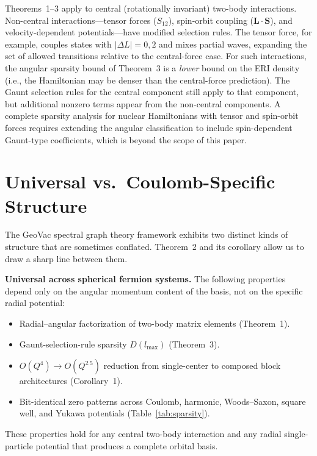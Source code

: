 \documentclass[twocolumn,pra,amsmath,amssymb,superscriptaddress]{revtex4-2}
\begin{document}
Theorems~1--3 apply to central (rotationally invariant) two-body
interactions.  Non-central interactions---tensor forces
($S_{12}$), spin-orbit coupling ($\mathbf{L} \cdot \mathbf{S}$),
and velocity-dependent potentials---have modified selection rules.
The tensor force, for example, couples states with
$|\Delta L| = 0, 2$ and mixes partial waves, expanding the set of
allowed transitions relative to the central-force case.  For such
interactions, the angular sparsity bound of Theorem~3 is a
\textit{lower} bound on the ERI density (i.e., the Hamiltonian
may be denser than the central-force prediction).  The Gaunt
selection rules for the central component still apply to that
component, but additional nonzero terms appear from the non-central
components.  A complete sparsity analysis for nuclear Hamiltonians
with tensor and spin-orbit forces requires extending the angular
classification to include spin-dependent Gaunt-type coefficients,
which is beyond the scope of this paper.

\section{Universal vs.\ Coulomb-Specific Structure}
\label{sec:universal}

The GeoVac spectral graph theory framework exhibits two distinct
kinds of structure that are sometimes conflated.  Theorem~2 and its
corollary allow us to draw a sharp line between them.

\medskip
\noindent\textbf{Universal across spherical fermion systems.}
The following properties depend only on the angular momentum
content of the basis, not on the specific radial potential:
\begin{itemize}
\item Radial--angular factorization of two-body matrix elements
  (Theorem~1).
\item Gaunt-selection-rule sparsity $D(l_{\max})$ (Theorem~3).
\item $O(Q^4) \to O(Q^{2.5})$ reduction from single-center to
  composed block architectures (Corollary~1).
\item Bit-identical zero patterns across Coulomb, harmonic,
  Woods--Saxon, square well, and Yukawa potentials
  (Table~\ref{tab:sparsity}).
\end{itemize}
These properties hold for any central two-body interaction and any
radial single-particle potential that produces a complete orbital
basis.
\end{document}
